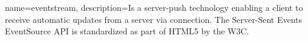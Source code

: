 {
    name={eventstream},
    description={Is a server-push technology enabling a client to receive automatic updates from a server via  connection. The Server-Sent Events EventSource API is standardized as part of HTML5 by the W3C\cite{eventstream}.}
}
